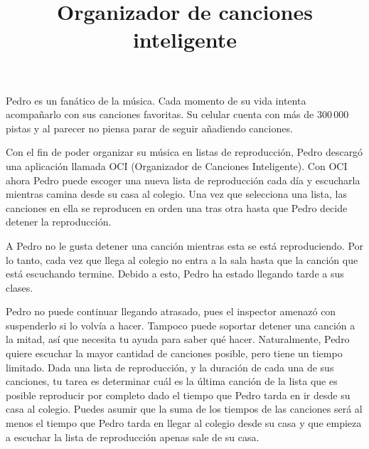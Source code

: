 \documentclass{oci}
\title{Organizador de canciones inteligente}
\begin{document}
\begin{problemDescription}
Pedro es un fanático de la música.
Cada momento de su vida intenta acompañarlo con sus canciones favoritas.
Su celular cuenta con más de 300\,000 pistas y al parecer no piensa parar de
seguir añadiendo canciones.

Con el fin de poder organizar su música en listas de reproducción, Pedro
descargó una aplicación llamada OCI (Organizador de Canciones Inteligente).
Con OCI ahora Pedro puede escoger una nueva lista de reproducción cada día y
escucharla mientras camina desde su casa al colegio.
Una vez que selecciona una lista, las canciones en ella se reproducen en orden
una tras otra hasta que Pedro decide detener la reproducción.

A Pedro no le gusta detener una canción mientras esta se está reproduciendo.
Por lo tanto, cada vez que llega al colegio no entra a la sala hasta que la
canción que está escuchando termine.
Debido a esto, Pedro ha estado llegando tarde a sus clases.

Pedro no puede continuar llegando atrasado, pues el inspector amenazó
con suspenderlo si lo volvía a hacer.
Tampoco puede soportar detener una canción a la mitad, así que necesita tu ayuda
para saber qué hacer.
Naturalmente, Pedro quiere escuchar la mayor cantidad de canciones posible,
pero tiene un tiempo limitado.
Dada una lista de reproducción, y la duración de cada una de sus canciones, tu
tarea es determinar cuál es la última canción de la lista que es posible
reproducir por completo dado el tiempo que Pedro tarda en ir desde su casa al
colegio.
Puedes asumir que la suma de los tiempos de las canciones será al menos el tiempo
que Pedro tarda en llegar al colegio desde su casa y que empieza a escuchar la
lista de reproducción apenas sale de su casa.

\end{problemDescription}
\end{document}
